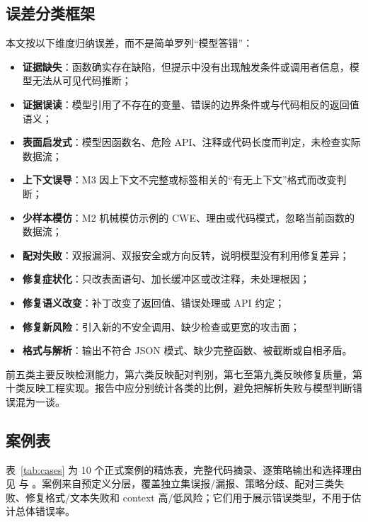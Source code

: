 \documentclass[conference]{IEEEtran}
\begin{document}
\subsection{误差分类框架}
本文按以下维度归纳误差，而不是简单罗列“模型答错”：
\begin{itemize}
    \item \textbf{证据缺失}：函数确实存在缺陷，但提示中没有出现触发条件或调用者信息，模型无法从可见代码推断；
    \item \textbf{证据误读}：模型引用了不存在的变量、错误的边界条件或与代码相反的返回值语义；
    \item \textbf{表面启发式}：模型因函数名、危险 API、注释或代码长度而判定，未检查实际数据流；
    \item \textbf{上下文误导}：M3 因上下文不完整或标签相关的“有无上下文”格式而改变判断；
    \item \textbf{少样本模仿}：M2 机械模仿示例的 CWE、理由或代码模式，忽略当前函数的数据流；
    \item \textbf{配对失败}：双报漏洞、双报安全或方向反转，说明模型没有利用修复差异；
    \item \textbf{修复症状化}：只改表面语句、加长缓冲区或改注释，未处理根因；
    \item \textbf{修复语义改变}：补丁改变了返回值、错误处理或 API 约定；
    \item \textbf{修复新风险}：引入新的不安全调用、缺少检查或更宽的攻击面；
    \item \textbf{格式与解析}：输出不符合 JSON 模式、缺少完整函数、被截断或自相矛盾。
\end{itemize}
前五类主要反映检测能力，第六类反映配对判别，第七至第九类反映修复质量，第十类反映工程实现。报告中应分别统计各类的比例，避免把解析失败与模型判断错误混为一谈。

\subsection{案例表}
表~\ref{tab:cases} 为 10 个正式案例的精炼表，完整代码摘录、逐策略输出和选择理由见  与 。案例来自预定义分层，覆盖独立集误报/漏报、策略分歧、配对三类失败、修复格式/文本失败和 context 高/低风险；它们用于展示错误类型，不用于估计总体错误率。
\end{document}
